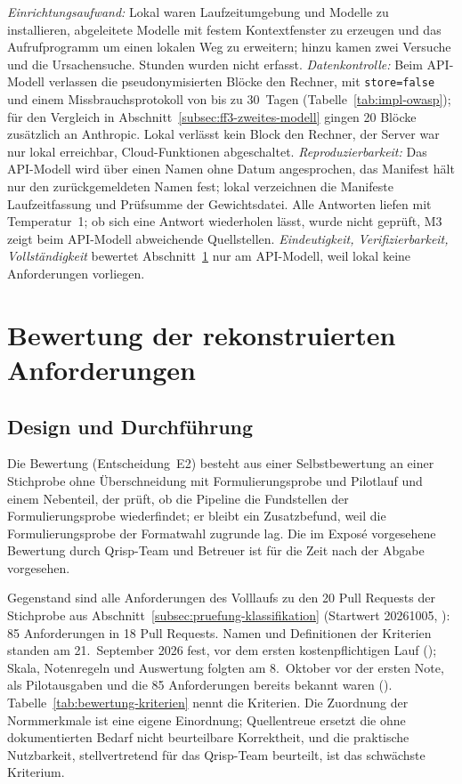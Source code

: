 \documentclass[11pt,a4paper]{report}
\begin{document}
\emph{Einrichtungsaufwand:} Lokal waren Laufzeitumgebung und Modelle
zu installieren, abgeleitete Modelle mit festem Kontextfenster zu
erzeugen und das Aufrufprogramm um einen lokalen Weg zu erweitern; hinzu
kamen zwei Versuche und die Ursachensuche. Stunden wurden nicht erfasst.
\emph{Datenkontrolle:} Beim API-Modell verlassen die pseudonymisierten
Blöcke den Rechner, mit \texttt{store=false} und einem
Missbrauchsprotokoll von bis zu 30~Tagen (Tabelle~\ref{tab:impl-owasp});
für den Vergleich in Abschnitt~\ref{subsec:ff3-zweites-modell} gingen
20 Blöcke zusätzlich an Anthropic. Lokal verlässt kein Block den
Rechner, der Server war nur lokal erreichbar, Cloud-Funktionen
abgeschaltet. \emph{Reproduzierbarkeit:} Das
API-Modell wird über einen Namen ohne Datum angesprochen, das Manifest
hält nur den zurückgemeldeten Namen fest; lokal verzeichnen die
Manifeste Laufzeitfassung und Prüfsumme der Gewichtsdatei. Alle Antworten
liefen mit Temperatur~1; ob sich eine Antwort wiederholen lässt, wurde
nicht geprüft, M3 zeigt beim API-Modell abweichende Quellstellen.
\emph{Eindeutigkeit, Verifizierbarkeit, Vollständigkeit} bewertet
Abschnitt~\ref{sec:eval-bewertung} nur am API-Modell, weil lokal keine
Anforderungen vorliegen.

\section{Bewertung der rekonstruierten Anforderungen}
\label{sec:eval-bewertung}

\subsection{Design und Durchführung}
\label{subsec:bewertung-design}
\label{subsec:bewertung-durchfuehrung}

Die Bewertung (Entscheidung~E2) besteht aus einer Selbstbewertung an
einer Stichprobe ohne Überschneidung mit Formulierungsprobe und
Pilotlauf und einem Nebenteil, der prüft, ob die Pipeline die
Fundstellen der Formulierungsprobe wiederfindet; er bleibt ein
Zusatzbefund, weil die Formulierungsprobe der Formatwahl zugrunde lag.
Die im Exposé vorgesehene Bewertung durch Qrisp-Team und Betreuer ist
für die Zeit nach der Abgabe vorgesehen.

Gegenstand sind alle Anforderungen des Volllaufs zu den 20 Pull Requests
der Stichprobe aus Abschnitt~\ref{subsec:pruefung-klassifikation}
(Startwert 20261005, ): 85 Anforderungen in
18 Pull Requests. Namen und Definitionen der Kriterien standen am
21.~September 2026 fest, vor dem ersten kostenpflichtigen Lauf
(); Skala, Notenregeln und
Auswertung folgten am 8.~Oktober vor der ersten Note, als Pilotausgaben
und die 85 Anforderungen bereits bekannt waren
(). Tabelle~\ref{tab:bewertung-kriterien} nennt die
Kriterien. Die Zuordnung der Normmerkmale ist eine eigene Einordnung;
Quellentreue ersetzt die ohne dokumentierten Bedarf nicht beurteilbare
Korrektheit, und die praktische Nutzbarkeit, stellvertretend für das
Qrisp-Team beurteilt, ist das schwächste Kriterium.
\end{document}
